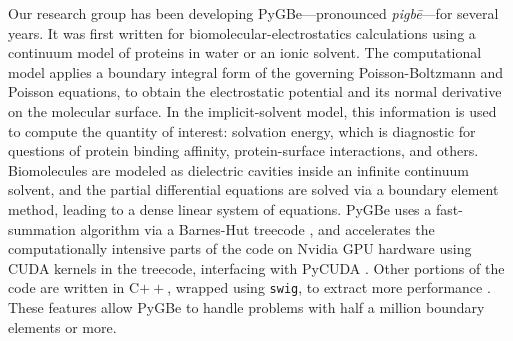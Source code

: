 Our research group has been developing PyGBe---pronounced \emph{pigb\={e}}---for several years. 
It was first written for biomolecular-electrostatics calculations using a continuum model of proteins in water or an ionic solvent. 
The computational model applies a boundary integral form of the governing Poisson-Boltzmann and Poisson equations, to obtain the electrostatic potential and its normal derivative on the molecular surface. 
In the implicit-solvent model, this information is used to compute the quantity of interest: solvation energy, which is diagnostic for questions of protein binding affinity, protein-surface interactions, and others. 
Biomolecules are modeled as dielectric cavities inside an infinite continuum solvent, and the partial differential equations are solved via a boundary element method, leading to a dense linear system of equations. 
PyGBe uses a fast-summation algorithm via a Barnes-Hut treecode \cite{BarnesHut1986}, and accelerates the computationally intensive parts of the code on Nvidia GPU hardware using CUDA kernels in the treecode, interfacing with PyCUDA \cite{klockner2012pycuda}. 
Other portions of the code are written in C$++$, wrapped using \texttt{swig}, to extract more performance \cite{CooperETal2016}. 
These features allow PyGBe to handle problems with half a million boundary elements or more. 

